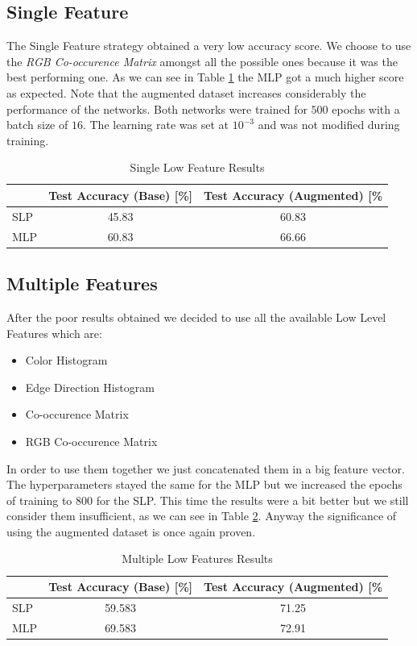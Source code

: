 \documentclass[10pt,a4paper]{report}
\begin{document}
\subsection{Single Feature}
The Single Feature strategy obtained a very low accuracy score. We choose to use the \textit{RGB Co-occurence Matrix} amongst all the possible ones because it was the best performing one. As we can see in Table \ref{tab:slf} the MLP got a much higher score as expected. Note that the augmented dataset increases considerably the performance of the networks. Both networks were trained for $500$ epochs with a batch size of $16$. The learning rate was set at $10^{-3}$ and was not modified during training.
\begin{table}[!ht]
\centering
\begin{tabular}{|l|c|c|}
\hline
    & \multicolumn{1}{l|}{Test Accuracy (Base) {[}\%{]}} & \multicolumn{1}{l|}{Test Accuracy (Augmented) {[}\%} \\ \hline
SLP & 45.83                                              & 60.83                                                \\ \hline
MLP & 60.83                                              & 66.66                                                \\ \hline
\end{tabular}
\caption{Single Low Feature Results}
\label{tab:slf}
\end{table}
\subsection{Multiple Features}
After the poor results obtained we decided to use all the available Low Level Features which are:
\begin{itemize}
\item Color Histogram
\item Edge Direction Histogram
\item Co-occurence Matrix
\item RGB Co-occurence Matrix
\end{itemize}
In order to use them together we just concatenated them in a big feature vector. The hyperparameters stayed the same for the MLP but we increased the epochs of training to $800$ for the SLP. This time the results were a bit better but we still consider them insufficient, as we can see in Table \ref{tab:mlf}. Anyway the significance of using the augmented dataset is once again proven.
\begin{table}[!ht]
\centering
\begin{tabular}{|l|c|c|}
\hline
    & \multicolumn{1}{l|}{Test Accuracy (Base) {[}\%{]}} & \multicolumn{1}{l|}{Test Accuracy (Augmented) {[}\%} \\ \hline
SLP & 59.583                                             & 71.25                                                \\ \hline
MLP & 69.583                                             & 72.91                                                \\ \hline
\end{tabular}
\caption{Multiple Low Features Results}
\label{tab:mlf}
\end{table}
\end{document}
